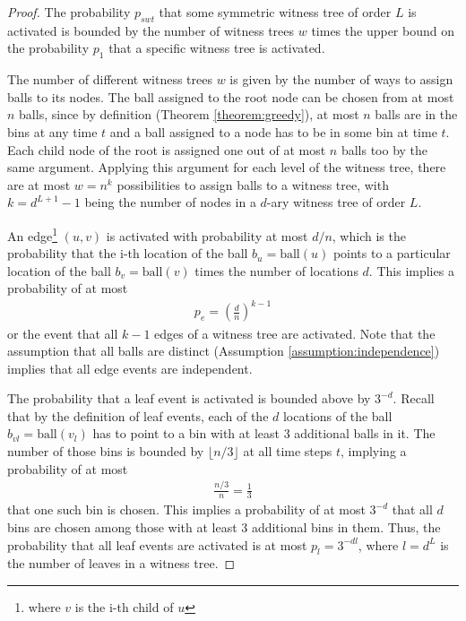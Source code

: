 \documentclass[a4paper,12pt]{article}
\begin{document}
\begin{proof}
The probability $p_{swt}$ that some symmetric witness tree of order $L$ is activated is bounded by the number of witness trees $w$ times the upper bound on the probability $p_1$ that a specific witness tree is activated.

The number of different witness trees $w$ is given by the number of ways to assign balls to its nodes. The ball assigned to the root node can be chosen from at most $n$ balls, since by definition (Theorem \ref{theorem:greedy}), at most $n$ balls are in the bins at any time $t$ and a ball assigned to a node has to be in some bin at time $t$. Each child node of the root is assigned one out of at most $n$ balls too by the same argument. Applying this argument for each level of the witness tree, there are at most $w = n^k$ possibilities to assign balls to a witness tree, with $k = d^{L+1}-1$ being the number of nodes in a $d$-ary witness tree of order $L$.
 
An edge\footnote{where $v$ is the i-th child of $u$} $(u, v)$ is activated with probability at most $d/n$, which is the probability that the i-th location of the ball $b_u = \mathrm{ball}(u)$ points to a particular location of the ball $b_v = \mathrm{ball}(v)$ times the number of locations $d$. This implies a probability of at most
\begin{align*}
p_e = \left(\frac{d}{n}\right)^{k-1}
\end{align*} 
or the event that all $k-1$ edges of a witness tree are activated. Note that  the assumption that all balls are distinct (Assumption \ref{assumption:independence}) implies that all edge events are independent.

The probability that a leaf event is activated is bounded above by $3^{-d}$. Recall that by the definition of leaf events, each of the $d$ locations of the ball $b_{vl} = \mathrm{ball}(v_l)$ has to point to a bin with at least 3 additional balls in it. The number of those bins is bounded by $\lfloor n/3 \rfloor$ at all time steps $t$, implying a probability of at most 
\begin{align*}
\frac{n/3}{n} = \frac{1}{3}
\end{align*}
that one such bin is chosen. This implies a probability of at most $3^{-d}$ that all $d$ bins are chosen among those with at least 3 additional bins in them. Thus, the probability that all leaf events are activated is at most $p_l = 3^{-d l}$, where $l = d^{L}$ is the number of leaves in a witness tree.


\end{proof}
\end{document}
